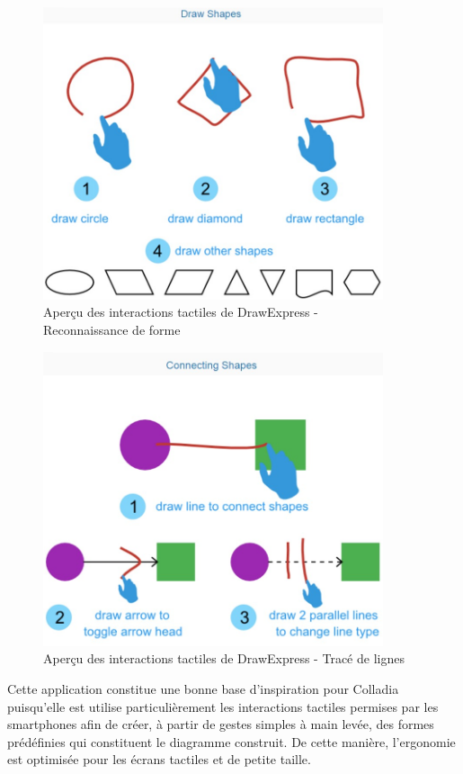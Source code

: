 \documentclass[a4paper,11pt]{article}
\begin{document}
\begin{figure}
	\centering
	\includegraphics[width=10cm]{img/DrawExpressRecognition.PNG}
	\caption{Aperçu des interactions tactiles de DrawExpress - \\Reconnaissance de forme}
\end{figure}

\begin{figure}
	\centering
	\includegraphics[width=10cm]{img/DrawExpressLinks.PNG}
	\caption{Aperçu des interactions tactiles de DrawExpress - Tracé de lignes}
\end{figure}

Cette application constitue une bonne base d’inspiration pour Colladia puisqu’elle est utilise particulièrement les interactions tactiles permises par les smartphones afin de créer, à partir de gestes simples à main levée, des formes prédéfinies qui constituent le diagramme construit. De cette manière, l’ergonomie est optimisée pour les écrans tactiles et de petite taille.
\end{document}
